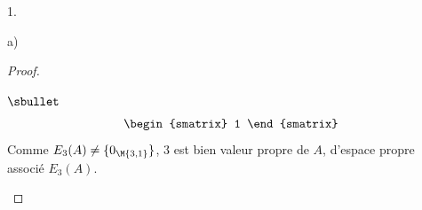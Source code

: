 \documentclass[11pt]{article}%
\begin{document}
\begin{noliste}{1.}
\begin{noliste}{a)}
\begin{proof}
\begin{noliste}{$\sbullet$}
\[\begin{array}{rcl}
{\begin{smatrix}
              1
            \end{smatrix}
          }
        \end{array}
        \]   
        Comme $E_3(A) \neq \{0_{\M{3,1}}\}$, $3$ est bien valeur
        propre de $A$, d'espace propre associé $E_3(A)$.%
        





\end{noliste}
\end{proof}
\end{noliste}
\end{noliste}
\end{document}

